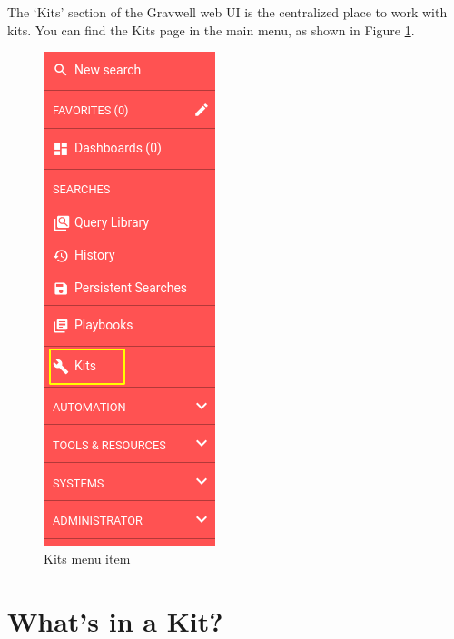 The `Kits' section of the Gravwell web UI is the centralized place to work with kits. You can find the Kits page in the main menu, as shown in Figure \ref{fig:kit-menu}.

\begin{figure}
	\includegraphics[width=0.6\linewidth]{images/kit-menu.png}
	\caption{Kits menu item}
	\label{fig:kit-menu}
\end{figure}

\section{What's in a Kit?}

